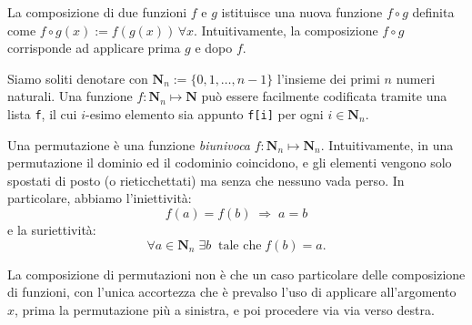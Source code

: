 \renewcommand{\inputfile}{\texttt{stdin}}
\renewcommand{\outputfile}{\texttt{stdout}}
\makeatletter
\renewcommand{\this@inputfilename}{\texttt{stdin}}
\renewcommand{\this@outputfilename}{\texttt{stdout}}
\makeatother

La composizione di due funzioni $f$ e $g$ istituisce una nuova funzione $f\circ g$ 
definita come $f\circ g (x) := f(g(x)) \, \forall x$. 
Intuitivamente, la composizione $f\circ g$ corrisponde ad applicare prima $g$ e dopo $f$.

Siamo soliti denotare con $\mathbf{N}_n := \{0,1, \ldots, n-1 \}$ l'insieme dei primi $n$ numeri naturali.
Una funzione $f:\mathbf{N}_n \mapsto \mathbf{N}$ può essere facilmente codificata 
tramite una lista {\tt f}, il cui $i$-esimo elemento sia appunto {\tt f[i]} per ogni $i\in \mathbf{N}_n$.

Una permutazione è una funzione \emph{biunivoca} $f:\mathbf{N}_n \mapsto \mathbf{N}_n$.
Intuitivamente, in una permutazione il dominio ed il codominio coincidono, 
e gli elementi vengono solo spostati di posto (o rieticchettati) ma senza che nessuno vada perso.
In particolare, abbiamo l'iniettività:
\[
   f(a) = f(b) \; \Rightarrow \; a=b
\]
e la suriettività:
\[
   \forall a\in \mathbf{N}_n  \; \exists b  \; \; \mbox{tale che}  \;f(b) = a.
\]

La composizione di permutazioni non è che un caso particolare delle composizione 
di funzioni, con l'unica accortezza che è prevalso l'uso di applicare all'argomento 
$x$, prima la permutazione più a sinistra, e poi procedere via via verso destra.

